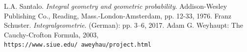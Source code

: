 \documentclass[a4paper,12pt]{article}
\begin{document}
\begin{thebibliography}{9}
 L.A. Santalo. \textit{Integral geometry and geometric probability}. Addison-Wesley Publishing Co., Reading, Mass.-London-Amsterdam, pp. 12-33, 1976.
 Franz Schuster. \textit{Integralgeometrie}. (German): pp. 3–6, 2017.
 Adam G. Weyhaupt: The Cauchy-Crofton Formula, 2003,\\\texttt{https://www.siue.edu/~aweyhau/project.html}
\end{thebibliography}
\end{document}
